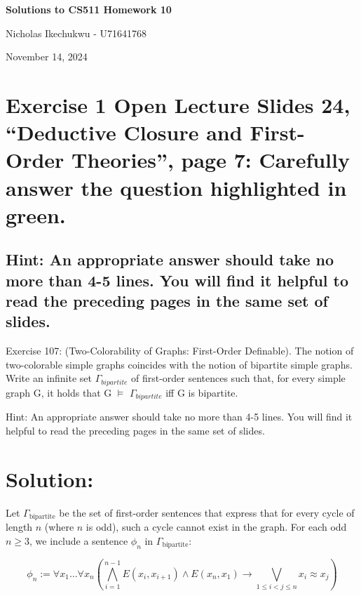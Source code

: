 \documentclass{article}
\begin{document}
\begin{center}
    \Large\textbf{Solutions to CS511 Homework 10}
    
    \vspace{0.5cm}
    
    \large Nicholas Ikechukwu - U71641768
    
    \vspace{0.3cm}
    
    \large November 14, 2024
\end{center}



\section*{Exercise 1 Open Lecture Slides 24, “Deductive Closure and First-Order Theories”, page 7:
Carefully answer the question highlighted in green.}

\subsection*{Hint: An appropriate answer should take no more than 4-5 lines. You will find it helpful to read the
preceding pages in the same set of slides. }

\begin{mdframed}
    Exercise 107: (Two-Colorability of Graphs: First-Order Deﬁnable). The notion of two-colorable
    simple graphs coincides with the notion of bipartite simple graphs. Write an inﬁnite set $\Gamma_{bipartite}$
    of ﬁrst-order sentences such that, for every simple graph G, it holds that G $\models$ $\Gamma_{bipartite}$ iﬀ G is
    bipartite.

    \vspace{1em} 
    Hint: An appropriate answer should take no more than 4-5 lines. You will find it helpful to read the
preceding pages in the same set of slides. 
\end{mdframed}
\section*{Solution:}
Let $\Gamma_{\text{bipartite}}$ be the set of first-order sentences that express that for every cycle of length $n$ (where $n$ is odd), such a cycle cannot exist in the graph. For each odd $n \geq 3$, we include a sentence $\phi_n$ in $\Gamma_{\text{bipartite}}$:
    
    \[
    \phi_n := \forall x_1 \ldots \forall x_n \left(\bigwedge_{i=1}^{n-1} E(x_i,x_{i+1}) \land E(x_n,x_1) \rightarrow \bigvee_{1 \leq i < j \leq n} x_i \approx x_j\right)
    \]
    
\end{document}
